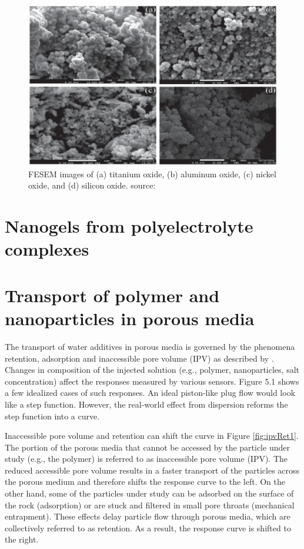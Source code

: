 \begin{figure}
    \centering
    \includegraphics[width=\textwidth]{img/fig/npFesem.png}
    \caption{FESEM images of (a) titanium oxide, (b) aluminum oxide, (c) nickel oxide, and (d) silicon oxide. source: \citet{Alomair2015} }
    \label{fig:npFesem}
\end{figure}
















\section{Nanogels from polyelectrolyte complexes}


\section{Transport of polymer and nanoparticles in porous media}
The transport of water additives in porous media is governed by the phenomena retention, adsorption and inaccessible pore volume (IPV) as described by \citep{Lotsch1985}. Changes in composition of the injected solution (e.g., polymer, nanoparticles, salt concentration) affect the responses measured by various sensors. Figure 5.1 shows a few idealized cases of such responses. An ideal piston-like plug flow would look like a step function. However, the real-world effect from dispersion reforms the step function into a curve.

Inaccessible pore volume and retention can shift the curve in Figure \ref{fig:ipvRet1}. The portion of the porous media that cannot be accessed by the particle under study (e.g., the polymer) is referred to as inaccessible pore volume (IPV). The reduced accessible pore volume results in a faster transport of the particles across the porous medium and therefore shifts the response curve to the left. On the other hand, some of the particles under study can be adsorbed on the surface of the rock (adsorption) or are stuck and filtered in small pore throats (mechanical entrapment). These effects delay particle flow through porous media, which are collectively referred to as retention. As a result, the response curve is shifted to the right. 


